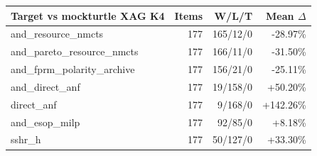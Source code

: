 \begin{tabular}{lrrr}
\toprule
Target vs mockturtle XAG K4 & Items & W/L/T & Mean $\Delta$ \\
\midrule
and\_resource\_nmcts & 177 & 165/12/0 & -28.97\% \\
and\_pareto\_resource\_nmcts & 177 & 166/11/0 & -31.50\% \\
and\_fprm\_polarity\_archive & 177 & 156/21/0 & -25.11\% \\
and\_direct\_anf & 177 & 19/158/0 & +50.20\% \\
direct\_anf & 177 & 9/168/0 & +142.26\% \\
and\_esop\_milp & 177 & 92/85/0 & +8.18\% \\
sshr\_h & 177 & 50/127/0 & +33.30\% \\
\bottomrule
\end{tabular}
